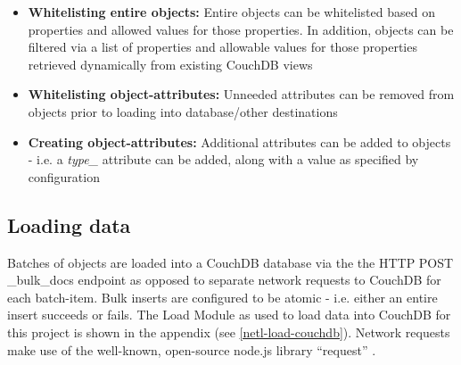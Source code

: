 \begin{itemize}
    \item \textbf{Whitelisting entire objects:} Entire objects can be whitelisted based on properties and allowed values for those properties. In addition, objects can be filtered via a list of properties and allowable values for those properties retrieved dynamically from existing CouchDB views
    \item \textbf{Whitelisting object-attributes:} Unneeded attributes can be removed from objects prior to loading into database/other destinations
    \item \textbf{Creating object-attributes:} Additional attributes can be added to objects - i.e. a \textit{type\_} attribute can be added, along with a value as specified by configuration
\end{itemize}

\subsection{Loading data}
Batches of objects are loaded into a CouchDB database via the the HTTP POST \_bulk\_docs endpoint as opposed to separate network requests to CouchDB for each batch-item. Bulk inserts are configured to be atomic - i.e. either an entire insert succeeds or fails. The Load Module as used to load data into CouchDB for this project is shown in the appendix (see \ref{netl-load-couchdb}). Network requests make use of the well-known, open-source node.js library ``request'' \cite{request-lib}.